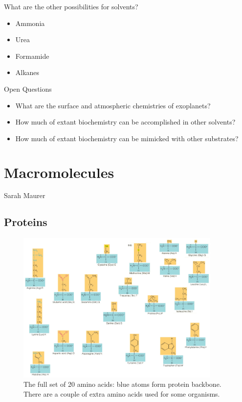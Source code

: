 \documentclass[]{article}
\begin{document}
What are the other possibilities for solvents?
\begin{itemize}
	\item Ammonia
	\item Urea
	\item Formamide
	\item Alkanes
\end{itemize}

Open Questions
\begin{itemize}
	\item What are the surface and atmospheric chemistries of
	exoplanets?
	\item How much of extant biochemistry can be accomplished
	in other solvents?
	\item How much of extant biochemistry can be mimicked with
	other substrates?
\end{itemize}
\section{Macromolecules}

Sarah Maurer

\subsection{Proteins}

\cite[25.9 Proteins]{brown2009chemistry}

\begin{figure}[H]
	\caption{The full set of 20 amino acids: blue atoms form protein backbone. There are a couple of extra amino acids used for some organisms.}\label{fig:AminoAcids} 
	\includegraphics[width=0.9\textwidth]{AminoAcids}
\end{figure}
\end{document}
